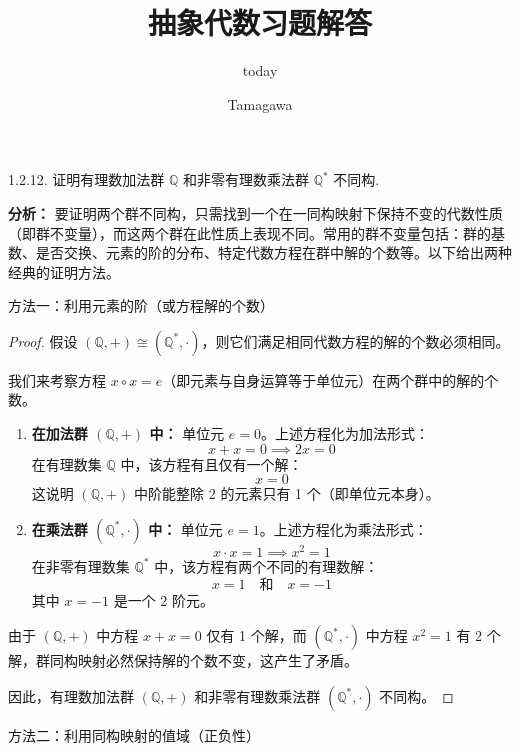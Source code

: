 \documentclass[]{article}
\title{抽象代数习题解答}
\author{today}
\author{Tamagawa}
\begin{document}
	
\maketitle
	
1.2.12. 证明有理数加法群 $\mathbb{Q}$ 和非零有理数乘法群 $\mathbb{Q}^*$ 不同构. 

\bigskip
\noindent \textbf{分析：} 
要证明两个群不同构，只需找到一个在一同构映射下保持不变的代数性质（即群不变量），而这两个群在此性质上表现不同。常用的群不变量包括：群的基数、是否交换、元素的阶的分布、特定代数方程在群中解的个数等。以下给出两种经典的证明方法。

\bigskip
方法一：利用元素的阶（或方程解的个数）

\begin{proof}
	假设 $(\mathbb{Q}, +) \cong (\mathbb{Q}^*, \cdot)$，则它们满足相同代数方程的解的个数必须相同。
	
	我们来考察方程 $x \circ x = e$（即元素与自身运算等于单位元）在两个群中的解的个数。
	
	\begin{enumerate}
		\item \textbf{在加法群 $(\mathbb{Q}, +)$ 中：}
		单位元 $e = 0$。上述方程化为加法形式：
		\[ x + x = 0 \implies 2x = 0 \]
		在有理数集 $\mathbb{Q}$ 中，该方程有且仅有一个解：
		\[ x = 0 \]
		这说明 $(\mathbb{Q}, +)$ 中阶能整除 2 的元素只有 1 个（即单位元本身）。
		
		\item \textbf{在乘法群 $(\mathbb{Q}^*, \cdot)$ 中：}
		单位元 $e = 1$。上述方程化为乘法形式：
		\[ x \cdot x = 1 \implies x^2 = 1 \]
		在非零有理数集 $\mathbb{Q}^*$ 中，该方程有两个不同的有理数解：
		\[ x = 1 \quad \text{和} \quad x = -1 \]
		其中 $x = -1$ 是一个 2 阶元。
	\end{enumerate}
	
	由于 $(\mathbb{Q}, +)$ 中方程 $x+x=0$ 仅有 1 个解，而 $(\mathbb{Q}^*, \cdot)$ 中方程 $x^2=1$ 有 2 个解，群同构映射必然保持解的个数不变，这产生了矛盾。
	
	因此，有理数加法群 $(\mathbb{Q}, +)$ 和非零有理数乘法群 $(\mathbb{Q}^*, \cdot)$ 不同构。
\end{proof}

\bigskip
方法二：利用同构映射的值域（正负性）
\end{document}
